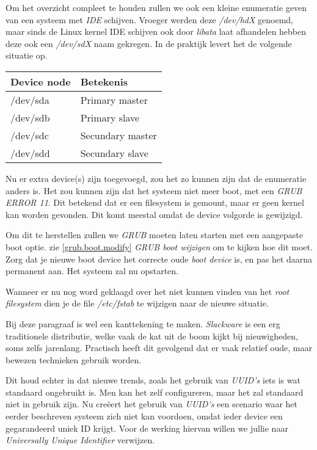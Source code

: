 Om het overzicht compleet te houden zullen we ook een kleine enumeratie geven van een systeem met \emph{IDE} schijven. Vroeger werden deze \emph{/dev/hdX} genoemd, maar sinds de Linux kernel IDE schijven ook door \emph{libata} laat afhandelen hebben deze ook een \emph{/dev/sdX} naam gekregen. In de praktijk levert het de volgende situatie op.\\
\begin{tabular}[t]{ll}
  \hline
  Device node & Betekenis\\
  \hline
  /dev/sda & Primary master\\
  /dev/sdb & Primary slave\\
  /dev/sdc & Secundary master\\
  /dev/sdd & Secundary slave\\
\end{tabular}

Nu er extra device(s) zijn toegevoegd, zou het zo kunnen zijn dat de enumeratie anders is. Het zou kunnen zijn dat het systeem niet meer boot, met een \emph{GRUB ERROR 11}. Dit betekend dat er een filesystem is gemount, maar er geen kernel kan worden gevonden. Dit komt meestal omdat de device volgorde is gewijzigd. 

Om dit te herstellen zullen we \emph{GRUB} moeten laten starten met een aangepaste boot optie. zie \ref{grub.boot.modify} \emph{GRUB boot wijzigen}  om te kijken hoe dit moet. Zorg dat je nieuwe boot device het correcte oude \emph{boot device} is, en pas het daarna permanent aan. Het systeem zal nu opstarten. 

Wanneer er nu nog word geklaagd over het niet kunnen vinden van het \emph{root filesystem} dien je de file \emph{/etc/fstab} te wijzigen naar de nieuwe situatie. 

Bij deze paragraaf is wel een kanttekening te maken. \emph{Slackware} is een erg traditionele distributie, welke vaak de kat uit de boom kijkt bij nieuwigheden, soms zelfs jarenlang. Practisch heeft dit gevolgend dat er vaak relatief oude, maar bewezen technieken gebruik worden. 

Dit houd echter in dat nieuwe trends, zoals het gebruik van \emph{UUID's} iets is wat standaard ongebruikt is. Men kan het zelf configureren, maar het zal standaard niet in gebruik zijn. Nu cre\"{e}ert het gebruik van \emph{UUID's} een scenario waar het eerder beschreven systeem zich niet kan voordoen, omdat ieder device een gegarandeerd uniek ID krijgt. Voor de werking hiervan willen we jullie naar \emph{Universally Unique Identifier}\cite{bib.uuid} verwijzen. 

